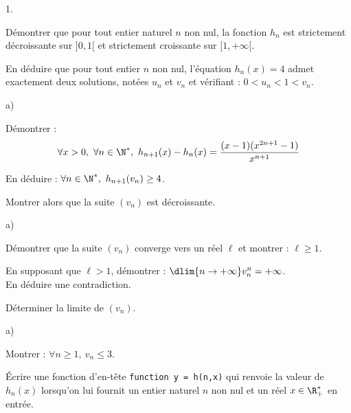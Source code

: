 \documentclass[11pt]{article}%
\begin{document}
\begin{noliste}{1.}
  \setlength{\itemsep}{4mm} %
  \setcounter{enumi}{2}
\item Démontrer que pour tout entier naturel $n$ non nul, la fonction
  $h_n$ est strictement décroissante sur $]0,1[$ et strictement
  croissante sur $[1,+\infty[$.
  
\item En déduire que pour tout entier $n$ non nul, l'équation
  $h_n(x)=4$ admet exactement deux solutions, notées $u_n$ et $v_n$ et
  vérifiant : $0 < u_n < 1 <v_n$.
  
\item
  \begin{noliste}{a)}
    \setlength{\itemsep}{2mm}
  \item Démontrer :
    \[
    \forall x > 0, \ \forall n \in \N^*, \ h_{n+1}(x) - h_n(x) = 
    \dfrac{(x-1)(x^{2n+1}-1)}{x^{n+1}}
    \]
    
  \item En déduire : $\forall n \in \N^*, \ h_{n+1}(v_n) \geq 4$.
    
  \item Montrer alors que la suite $(v_n)$ est décroissante.
  \end{noliste}
  
\item 
  \begin{noliste}{a)}
    \setlength{\itemsep}{2mm}
  \item Démontrer que la suite $(v_n)$ converge vers un réel $\ell$ et 
    montrer : $\ell \geq 1$.
    
  \item En supposant que $\ell >1$, démontrer : $\dlim{n \to +\infty}
    v_n^n = +\infty$.\\
    En déduire une contradiction.
    
  \item Déterminer la limite de $(v_n)$.
  \end{noliste}
  
\item
  \begin{noliste}{a)}
    \setlength{\itemsep}{2mm}
  \item Montrer : $\forall n \geq 1, \ v_n \leq 3$.
    
  \item Écrire une fonction \Scilab{} d'en-tête {\tt function y =
      h(n,x)} qui renvoie la valeur de $h_n(x)$ lorsqu'on lui fournit
    un entier naturel $n$ non nul et un réel $x \in \R_+^{*}$ en
    entrée.
    

\end{noliste}
\end{noliste}
\end{document}

